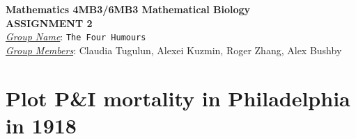 \documentclass[12pt]{article}
\begin{document}


\begin{center}
{\bf Mathematics 4MB3/6MB3 Mathematical Biology\\
 ASSIGNMENT 2}\\
\medskip
\underline{\emph{Group Name}}: \texttt{{\color{blue}The Four Humours}}\\
\medskip
\underline{\emph{Group Members}}: {\color{blue}Claudia Tugulun, Alexei Kuzmin, Roger Zhang, Alex Bushby}
\end{center}

\section{Plot P\&I mortality in Philadelphia in 1918}
\end{document}
